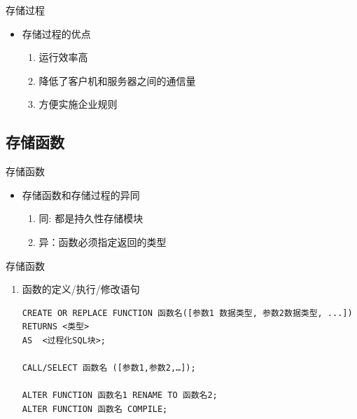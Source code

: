 \begin{frame}{存储过程}
\begin{itemize}
    \item 存储过程的优点
    \begin{enumerate}
\item 运行效率高
\item 降低了客户机和服务器之间的通信量	
\item 方便实施企业规则
\end{enumerate}
\end{itemize}
\end{frame}

\subsection{存储函数}
\begin{frame}{存储函数}
\begin{itemize}
    \item 存储函数和存储过程的异同
    \begin{enumerate}
\item 同: 都是持久性存储模块
\item 异：函数必须指定返回的类型
\end{enumerate}
\end{itemize}
\end{frame}

\begin{frame}{存储函数}
\begin{enumerate}
    \item 函数的定义/执行/修改语句 
\begin{block}{}
\begin{lstlisting}
CREATE OR REPLACE FUNCTION 函数名([参数1 数据类型, 参数2数据类型, ...]) 
RETURNS <类型>
AS  <过程化SQL块>;

CALL/SELECT 函数名 ([参数1,参数2,…]);

ALTER FUNCTION 函数名1 RENAME TO 函数名2;
ALTER FUNCTION 函数名 COMPILE;

\end{lstlisting}
\end{block}

\end{enumerate}

\end{frame}



